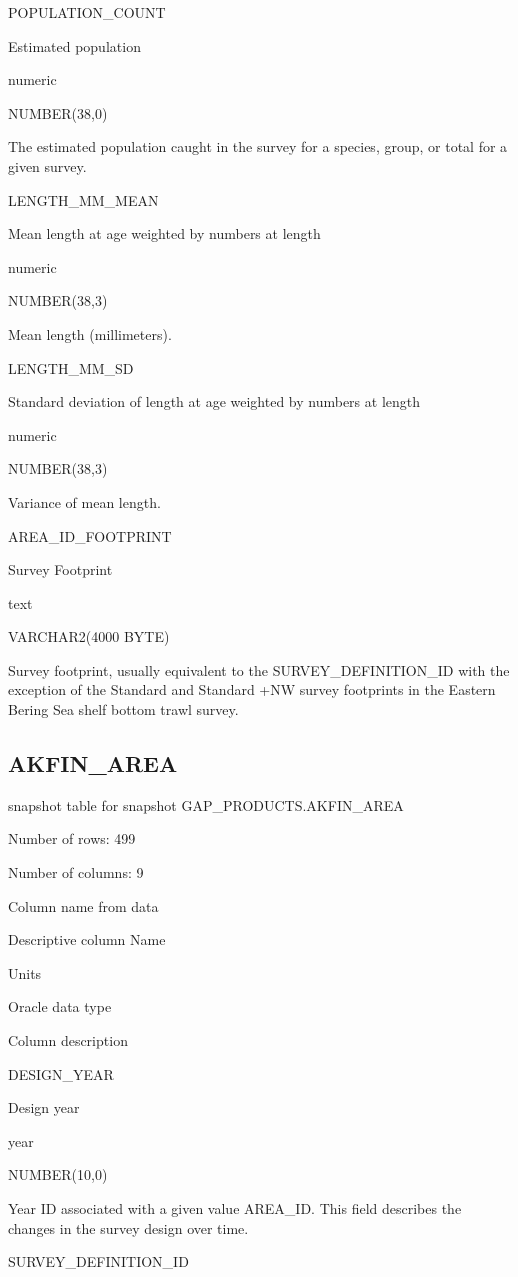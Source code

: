 \documentclass[
  letterpaper,
  oneside,
  open=any]{scrbook}
\begin{document}
POPULATION\_COUNT

Estimated population

numeric

NUMBER(38,0)

The estimated population caught in the survey for a species, group, or
total for a given survey.

LENGTH\_MM\_MEAN

Mean length at age weighted by numbers at length

numeric

NUMBER(38,3)

Mean length (millimeters).

LENGTH\_MM\_SD

Standard deviation of length at age weighted by numbers at length

numeric

NUMBER(38,3)

Variance of mean length.

AREA\_ID\_FOOTPRINT

Survey Footprint

text

VARCHAR2(4000 BYTE)

Survey footprint, usually equivalent to the SURVEY\_DEFINITION\_ID with
the exception of the Standard and Standard +NW survey footprints in the
Eastern Bering Sea shelf bottom trawl survey.

\subsection{AKFIN\_AREA}\label{akfin_area}

snapshot table for snapshot GAP\_PRODUCTS.AKFIN\_AREA

Number of rows: 499

Number of columns: 9

Column name from data

Descriptive column Name

Units

Oracle data type

Column description

DESIGN\_YEAR

Design year

year

NUMBER(10,0)

Year ID associated with a given value AREA\_ID. This field describes the
changes in the survey design over time.

SURVEY\_DEFINITION\_ID
\end{document}
